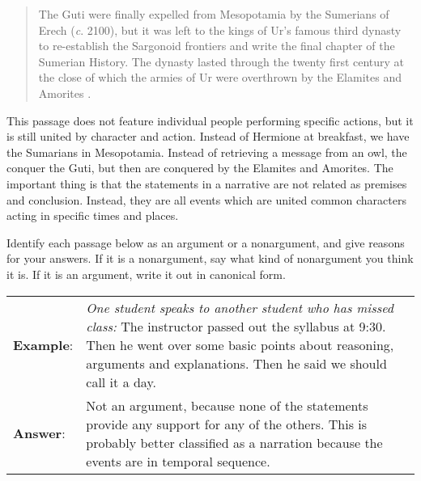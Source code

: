 \begin{quotation}\noindent The Guti were finally expelled from Mesopotamia by the Sumerians of Erech (\textit{c}. 2100), but it was left to the kings of Ur's famous third dynasty to re-establish the Sargonoid frontiers and write the final chapter of the Sumerian History. The dynasty lasted through the twenty first century at the close of which the armies of Ur were overthrown by the Elamites and Amorites \citep{McEvedy1967}. \end{quotation} 

This passage does not feature individual people performing specific actions, but it is still united by character and action. Instead of Hermione at breakfast, we have the Sumarians in Mesopotamia. Instead of retrieving a message from an owl, the conquer the Guti, but then are conquered by the Elamites and Amorites. The important thing is that the statements in a narrative are not related as premises and conclusion. Instead, they are all events which are united common characters acting in specific times and places. 


\practiceproblems
\problempart Identify each passage below as an argument or a nonargument, and give reasons for your answers. If it is a nonargument, say what kind of nonargument you think it is. If it is an argument, write it out in canonical form.

\begin{longtabu}{p{.1\linewidth}p{.9\linewidth}}
\textbf{Example}: & \textit{One student speaks to another student who has missed class:} The instructor passed out the syllabus at 9:30. Then he went over some basic points about reasoning, arguments and explanations. Then he said we should call it a day. \\
\textbf{Answer}: & Not an argument, because none of the statements provide any support for any of the others. This is probably better classified as a narration because the events are in temporal sequence. \\
\end{longtabu}

